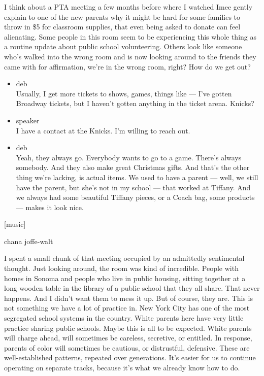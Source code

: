 I think about a PTA meeting a few months before where I watched Imee
gently explain to one of the new parents why it might be hard for some
families to throw in \$5 for classroom supplies, that even being asked
to donate can feel alienating. Some people in this room seem to be
experiencing this whole thing as a routine update about public school
volunteering. Others look like someone who's walked into the wrong room
and is now looking around to the friends they came with for affirmation,
we're in the wrong room, right? How do we get out?

\begin{itemize}
\item
  deb\\
  Usually, I get more tickets to shows, games, things like --- I've
  gotten Broadway tickets, but I haven't gotten anything in the ticket
  arena. Knicks?
\item
  speaker\\
  I have a contact at the Knicks. I'm willing to reach out.
\item
  deb\\
  Yeah, they always go. Everybody wants to go to a game. There's always
  somebody. And they also make great Christmas gifts. And that's the
  other thing we're lacking, is actual items. We used to have a parent
  --- well, we still have the parent, but she's not in my school ---
  that worked at Tiffany. And we always had some beautiful Tiffany
  pieces, or a Coach bag, some products --- makes it look nice.
\end{itemize}

{[}music{]}

chana joffe-walt

I spent a small chunk of that meeting occupied by an admittedly
sentimental thought. Just looking around, the room was kind of
incredible. People with homes in Sonoma and people who live in public
housing, sitting together at a long wooden table in the library of a
public school that they all share. That never happens. And I didn't want
them to mess it up. But of course, they are. This is not something we
have a lot of practice in. New York City has one of the most segregated
school systems in the country. White parents here have very little
practice sharing public schools. Maybe this is all to be expected. White
parents will charge ahead, will sometimes be careless, secretive, or
entitled. In response, parents of color will sometimes be cautious, or
distrustful, defensive. These are well-established patterns, repeated
over generations. It's easier for us to continue operating on separate
tracks, because it's what we already know how to do.


